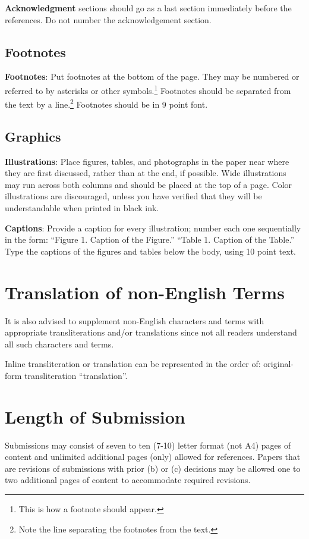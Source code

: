 \documentclass[11pt,letterpaper]{article}
\begin{document}
\textbf{Acknowledgment} sections should go as a last section immediately
before the references. Do not number the acknowledgement section.

\subsection{Footnotes}

{\bf Footnotes}: Put footnotes at the bottom of the page. They may
be numbered or referred to by asterisks or other
symbols.\footnote{This is how a footnote should appear.} Footnotes
should be separated from the text by a line.\footnote{Note the
line separating the footnotes from the text.}  Footnotes should be in 9 point font.

\subsection{Graphics}

{\bf Illustrations}: Place figures, tables, and photographs in the
paper near where they are first discussed, rather than at the end, if
possible.  Wide illustrations may run across both columns and should be placed at
the top of a page. Color illustrations are discouraged, unless you have verified that
they will be understandable when printed in black ink.

{\bf Captions}: Provide a caption for every illustration; number each one
sequentially in the form:  ``Figure 1. Caption of the Figure.'' ``Table 1.
Caption of the Table.''  Type the captions of the figures and
tables below the body, using 10 point text.

\section{Translation of non-English Terms}

It is also advised to supplement non-English characters and terms
with appropriate transliterations and/or translations
since not all readers understand all such characters and terms.

Inline transliteration or translation can be represented in
the order of: original-form transliteration ``translation''.

\section{Length of Submission}
\label{sec:length}

Submissions may consist of seven to ten (7-10) letter format (not A4) pages of content and unlimited additional pages (only) allowed for references. Papers that are revisions of submissions with prior (b) or (c) decisions may be allowed one to two additional pages of content to accommodate required revisions.
\end{document}
